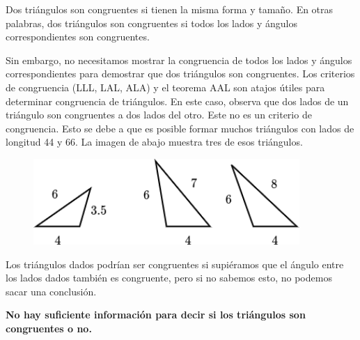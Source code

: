 \begin{solutionbox}{6cm}\footnotesize
    Dos triángulos son congruentes si tienen la misma forma y tamaño. En otras palabras, dos triángulos son congruentes si todos los lados y ángulos correspondientes son congruentes.

    \begin{minipage}{0.5\textwidth}
        Sin embargo, no necesitamos mostrar la congruencia de todos los lados y ángulos correspondientes para demostrar que dos triángulos son congruentes. Los criterios de congruencia (LLL, LAL, ALA) y el teorema AAL son atajos útiles para determinar congruencia de triángulos.
        En este caso, observa que dos lados de un triángulo son congruentes a dos lados del otro. Este no es un criterio de congruencia.
        Esto se debe a que es posible formar muchos triángulos con lados de longitud 44 y 66. La imagen de abajo muestra tres de esos triángulos.
    \end{minipage}%
    \begin{minipage}{0.45\textwidth}
        \begin{figure}[H]
            \centering
            \includegraphics[width=0.9\textwidth]{../images/20230323154235}
            \caption{}
            \label{fig:20230323154235}
        \end{figure}
    \end{minipage}

    Los triángulos dados podrían ser congruentes si supiéramos que el ángulo entre los lados dados también es congruente, pero si no sabemos esto, no podemos sacar una conclusión.

    \textbf{No hay suficiente información para decir si los triángulos son congruentes o no.}
\end{solutionbox}